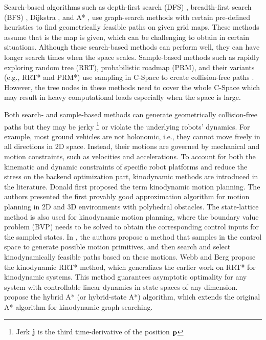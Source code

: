 \documentclass[letterpaper,journal,twoside]{IEEEtran}
\begin{document}
% 
{Search-based} algorithms such as depth-first 
search (DFS) \cite{cormen2022introduction}, 
breadth-first search (BFS) \cite{cormen2022introduction}, 
Dijkstra \cite{wang2011application}, and 
A* \cite{hart1968formal}, use graph-search methods 
with certain pre-defined heuristics to find 
geometrically feasible paths on given grid maps. 
These methods assume that 
is the map is given, which can be challenging to obtain
in certain situations. 
Although these search-based methods can perform well, they 
can have longer search times when the space scales.
{Sample-based} methods such as rapidly exploring random 
tree (RRT), probabilistic roadmap (PRM), and their 
variants (e.g., RRT* and PRM*) use sampling in C-Space 
to create collision-free paths \cite{lavalle2001rapidly,
karaman2011sampling,kavraki1996probabilistic}. 
% 
However, the tree nodes in these methods need to cover the 
whole C-Space which may result in heavy computational 
loads especially when the space is large.  

Both search- and sample-based methods can generate 
geometrically collision-free paths but they may be jerky
\footnote{Jerk $\mathbf{j}$ is the third time-derivative 
of the position $\mathbf{p}$} or 
violate the underlying robots' dynamics.
For example, most ground vehicles are not 
holonomic, i.e., they cannot move freely in all directions 
in 2D space. Instead, their motions are governed by  
mechanical and motion constraints, such as velocities and 
accelerations.
To account for both the kinematic and dynamic 
constraints of specific
robot platforms and reduce the stress on the backend 
optimization part, {kinodynamic} methods are introduced
in the literature. 
Donald \etal \cite{donald1993kinodynamic} first proposed 
the term {kinodynamic} motion planning.
The authors presented the first provably good approximation 
algorithm for motion planning
in 2D and 3D environments with polyhedral obstacles.
The state-lattice method \cite{pivtoraiko2011kinodynamic} is also 
used for kinodynamic motion 
planning, where the boundary value problem (BVP) needs to be 
solved to obtain the corresponding control inputs 
for the sampled states. 
In \cite{zhou2019robust}, the authors propose a method that
samples in the control space to generate possible motion 
primitives, and then 
search and select kinodynamically
feasible paths based on these motions. 
Webb and Berg \cite{webb2013kinodynamic} propose the
kinodynamic RRT* method, which generalizes the
earlier work on RRT* \cite{karaman2011sampling} for kinodynamic 
systems. This method guarantees asymptotic optimality for 
any system with controllable linear
dynamics in state spaces of any dimension.
\cite{dolgov2008practical,dolgov2009autonomous,dolgov2010path}
propose the hybrid A* (or hybrid-state A*) algorithm, which 
extends the original A* algorithm for kinodynamic graph searching.
\end{document}
